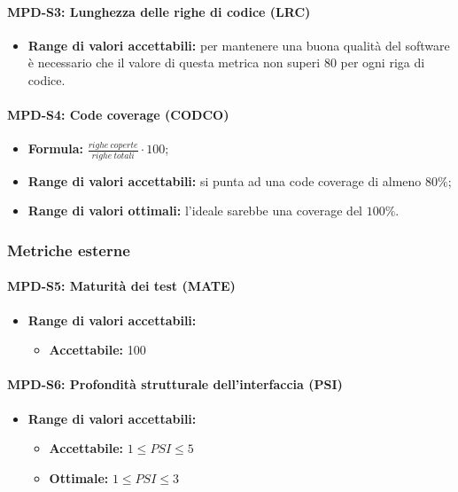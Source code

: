 \paragraph{MPD-S3: Lunghezza delle righe di codice (LRC)}
\begin{itemize}
    \item \textbf{Range di valori accettabili:} per mantenere una buona qualità del software è necessario che il valore di questa metrica non superi
          80 per ogni riga di codice.
\end{itemize}

\paragraph{MPD-S4: Code coverage (CODCO)}
\begin{itemize}
    \item \textbf{Formula:} $\frac{righe \ coperte}{righe \ totali} \cdot 100$;
    \item \textbf{Range di valori accettabili:} si punta ad una code coverage di almeno $80\%$;
    \item \textbf{Range di valori ottimali:} l'ideale sarebbe una coverage del $100\%$.
\end{itemize}

\subsubsection{Metriche esterne}

\paragraph{MPD-S5: Maturità dei test (MATE)}
\begin{itemize}
    \item \textbf{Range di valori accettabili:}
          \begin{itemize}
              \item \textbf{Accettabile:} 100%
          \end{itemize}
\end{itemize}

\paragraph{MPD-S6: Profondità strutturale dell'interfaccia (PSI)}
\begin{itemize}
    \item \textbf{Range di valori accettabili:}
          \begin{itemize}
              \item \textbf{Accettabile:} $1 \leq PSI \leq 5$
              \item \textbf{Ottimale:} $1 \leq PSI \leq 3$
          \end{itemize}
\end{itemize}

